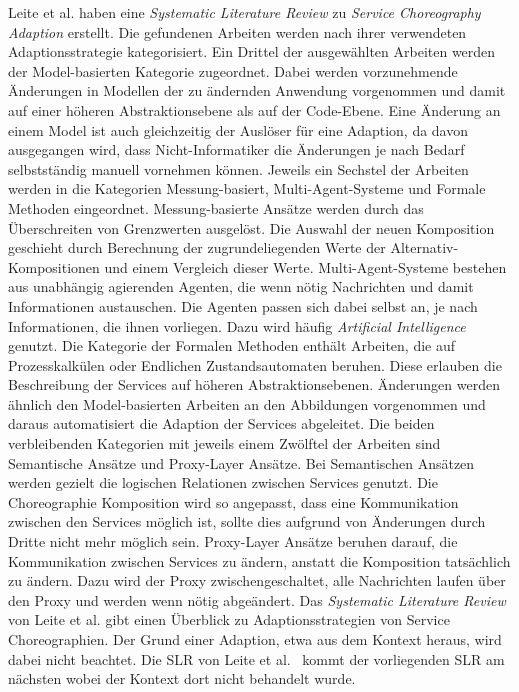 \documentclass[conference,compsoc,ngerman]{IEEEtran}
\begin{document}
Leite et al. \cite{leite2013systematic} haben eine \textit{Systematic Literature Review} zu \textit{Service Choreography Adaption} erstellt. Die gefundenen Arbeiten werden nach ihrer verwendeten Adaptionsstrategie kategorisiert. Ein Drittel der ausgewählten Arbeiten werden der Model-basierten Kategorie zugeordnet. Dabei werden vorzunehmende Änderungen in Modellen der zu ändernden Anwendung vorgenommen und damit auf einer höheren Abstraktionsebene als auf der Code-Ebene. Eine Änderung an einem Model ist auch gleichzeitig der Auslöser für eine Adaption, da davon ausgegangen wird, dass Nicht-Informatiker die Änderungen je nach Bedarf selbstständig manuell vornehmen können. Jeweils ein Sechstel der Arbeiten werden in die Kategorien Messung-basiert, Multi-Agent-Systeme und Formale Methoden eingeordnet. Messung-basierte Ansätze werden durch das Überschreiten von Grenzwerten ausgelöst. Die Auswahl der neuen Komposition geschieht durch Berechnung der zugrundeliegenden Werte der Alternativ-Kompositionen und einem Vergleich dieser Werte. Multi-Agent-Systeme bestehen aus unabhängig agierenden Agenten, die wenn nötig Nachrichten und damit Informationen austauschen. Die Agenten passen sich dabei selbst an, je nach Informationen, die ihnen vorliegen. Dazu wird häufig \textit{Artificial Intelligence} genutzt. Die Kategorie der Formalen Methoden enthält Arbeiten, die auf Prozesskalkülen oder Endlichen Zustandsautomaten beruhen. Diese erlauben die Beschreibung der Services auf höheren Abstraktionsebenen. Änderungen werden ähnlich den Model-basierten Arbeiten an den Abbildungen vorgenommen und daraus automatisiert die Adaption der Services abgeleitet. Die beiden verbleibenden Kategorien mit jeweils einem Zwölftel der Arbeiten sind Semantische Ansätze und Proxy-Layer Ansätze. Bei Semantischen Ansätzen werden gezielt die logischen Relationen zwischen Services genutzt. Die Choreographie Komposition wird so angepasst, dass eine Kommunikation zwischen den Services möglich ist, sollte dies aufgrund von Änderungen durch Dritte nicht mehr möglich sein. Proxy-Layer Ansätze beruhen darauf, die Kommunikation zwischen Services zu ändern, anstatt die Komposition tatsächlich zu ändern. Dazu wird der Proxy zwischengeschaltet, alle Nachrichten laufen über den Proxy und werden wenn nötig abgeändert.
Das \textit{Systematic Literature Review} von Leite et al. \cite{leite2013systematic} gibt einen Überblick zu Adaptionsstrategien von Service Choreographien. Der Grund einer Adaption, etwa aus dem Kontext heraus, wird dabei nicht beachtet.
Die SLR von Leite et al.~\cite{leite2013systematic} kommt der vorliegenden SLR am nächsten wobei der Kontext dort nicht behandelt wurde.
\end{document}
